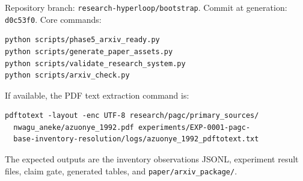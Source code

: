 Repository branch: \texttt{research-hyperloop/bootstrap}. Commit at generation: \texttt{d0c53f0}. Core commands:

\begin{verbatim}
python scripts/phase5_arxiv_ready.py
python scripts/generate_paper_assets.py
python scripts/validate_research_system.py
python scripts/arxiv_check.py
\end{verbatim}

If available, the PDF text extraction command is:

\begin{verbatim}
pdftotext -layout -enc UTF-8 research/pagc/primary_sources/
  nwagu_aneke/azuonye_1992.pdf experiments/EXP-0001-pagc-
  base-inventory-resolution/logs/azuonye_1992_pdftotext.txt
\end{verbatim}

The expected outputs are the inventory observations JSONL, experiment result files, claim gate, generated tables, and \texttt{paper/arxiv\_package/}.
